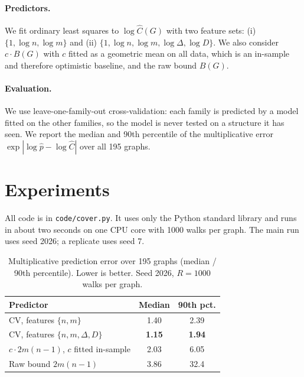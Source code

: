 \documentclass{article}
\begin{document}
\paragraph{Predictors.} We fit ordinary least squares to $\log \hat{C}(G)$ with two feature sets: (i) $\{1,\log n,\log m\}$ and (ii) $\{1,\log n,\log m,\log\Delta,\log D\}$. We also consider $c\cdot B(G)$ with $c$ fitted as a geometric mean on all data, which is an in-sample and therefore optimistic baseline, and the raw bound $B(G)$.

\paragraph{Evaluation.} We use leave-one-family-out cross-validation: each family is predicted by a model fitted on the other families, so the model is never tested on a structure it has seen. We report the median and 90th percentile of the multiplicative error $\exp|\log\hat{p}-\log\hat{C}|$ over all 195 graphs.

\section{Experiments}
\label{sec:exp}

All code is in \texttt{code/cover.py}. It uses only the Python standard library and runs in about two seconds on one CPU core with 1000 walks per graph. The main run uses seed 2026; a replicate uses seed 7.

\begin{table}[t]
\caption{Multiplicative prediction error over 195 graphs (median / 90th percentile). Lower is better. Seed 2026, $R=1000$ walks per graph.}
\label{tab:main}
\begin{center}
\begin{small}
\begin{tabular}{lcc}
\toprule
Predictor & Median & 90th pct. \\
\midrule
CV, features $\{n,m\}$ & 1.40 & 2.39 \\
CV, features $\{n,m,\Delta,D\}$ & \textbf{1.15} & \textbf{1.94} \\
$c\cdot 2m(n-1)$, $c$ fitted in-sample & 2.03 & 6.05 \\
Raw bound $2m(n-1)$ & 3.86 & 32.4 \\
\bottomrule
\end{tabular}
\end{small}
\end{center}
\vskip -0.1in
\end{table}
\end{document}
